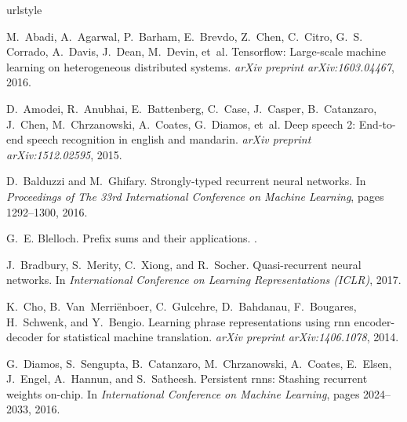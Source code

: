\documentclass{article}
\begin{document}
\begin{thebibliography}{19}
\providecommand{\natexlab}[1]{#1}
\providecommand{\url}[1]{\texttt{#1}}
\expandafter\ifx\csname urlstyle\endcsname\relax
  \providecommand{\doi}[1]{doi: #1}\else
  \providecommand{\doi}{doi: \begingroup \urlstyle{rm}\Url}\fi

M.~Abadi, A.~Agarwal, P.~Barham, E.~Brevdo, Z.~Chen, C.~Citro, G.~S. Corrado,
  A.~Davis, J.~Dean, M.~Devin, et~al.
\newblock Tensorflow: Large-scale machine learning on heterogeneous distributed
  systems.
\newblock \emph{arXiv preprint arXiv:1603.04467}, 2016.

D.~Amodei, R.~Anubhai, E.~Battenberg, C.~Case, J.~Casper, B.~Catanzaro,
  J.~Chen, M.~Chrzanowski, A.~Coates, G.~Diamos, et~al.
\newblock Deep speech 2: End-to-end speech recognition in english and mandarin.
\newblock \emph{arXiv preprint arXiv:1512.02595}, 2015.

D.~Balduzzi and M.~Ghifary.
\newblock Strongly-typed recurrent neural networks.
\newblock In \emph{Proceedings of The 33rd International Conference on Machine
  Learning}, pages 1292--1300, 2016.

G.~E. Blelloch.
\newblock Prefix sums and their applications.
.

J.~Bradbury, S.~Merity, C.~Xiong, and R.~Socher.
\newblock Quasi-recurrent neural networks.
\newblock In \emph{International Conference on Learning Representations
  (ICLR)}, 2017.

K.~Cho, B.~Van~Merri{\"e}nboer, C.~Gulcehre, D.~Bahdanau, F.~Bougares,
  H.~Schwenk, and Y.~Bengio.
\newblock Learning phrase representations using rnn encoder-decoder for
  statistical machine translation.
\newblock \emph{arXiv preprint arXiv:1406.1078}, 2014.

G.~Diamos, S.~Sengupta, B.~Catanzaro, M.~Chrzanowski, A.~Coates, E.~Elsen,
  J.~Engel, A.~Hannun, and S.~Satheesh.
\newblock Persistent rnns: Stashing recurrent weights on-chip.
\newblock In \emph{International Conference on Machine Learning}, pages
  2024--2033, 2016.


\end{thebibliography}
\end{document}
